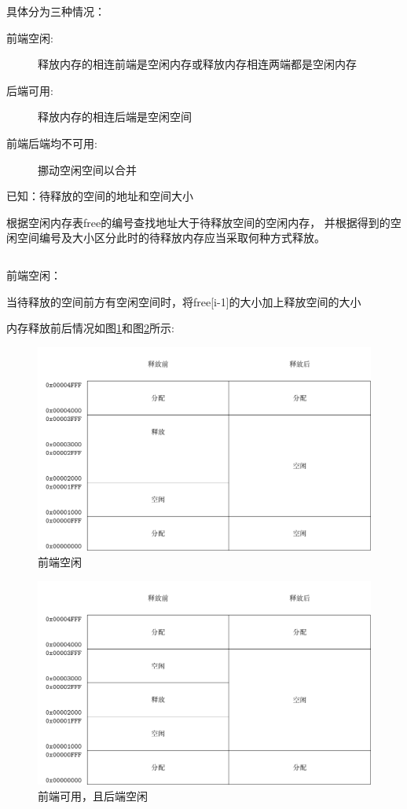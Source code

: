 具体分为三种情况：

\begin{description}
\item[前端空闲:]释放内存的相连前端是空闲内存或释放内存相连两端都是空闲内存
\item[后端可用:]释放内存的相连后端是空闲空间
\item[前端后端均不可用:]挪动空闲空间以合并
\end{description}

已知：待释放的空间的地址和空间大小

根据空闲内存表free的编号查找地址大于待释放空间的空闲内存，
并根据得到的空闲空间编号及大小区分此时的待释放内存应当采取何种方式释放。
\begin{listing}[H]
  \inputminted[tabsize=2, firstline=91, lastline=95,
  linenos=true]{c}{../ZOS/src/kernel/memory.c}
\end{listing}

\newpage
前端空闲：

当待释放的空间前方有空闲空间时，将free[i-1]的大小加上释放空间的大小

内存释放前后情况如图\ref{fig:mem0}和图\ref{fig:mem1}所示: 

\begin{figure}[h]
  \centering
  \includegraphics[width=.8\textwidth]{fig/mem0.pdf}
  \caption{前端空闲}
  \label{fig:mem0}
\end{figure}

\begin{figure}[h]
  \centering
  \includegraphics[width=.8\textwidth]{fig/mem1.pdf}
  \caption{前端可用，且后端空闲}
  \label{fig:mem1}
\end{figure}


